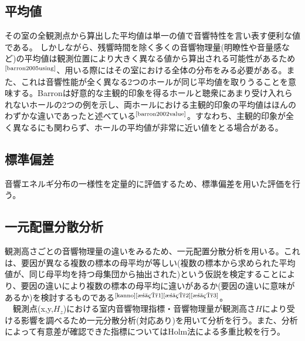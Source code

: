 \subsection{平均値}
その室の全観測点から算出した平均値は単一の値で音響特性を言い表す便利な値である。
しかしながら、残響時間を除く多くの音響物理量(明瞭性や音量感など)の平均値は観測位置により大きく異なる値から算出される可能性があるため$^{\text{\cite{barron2005using}}}$、用いる際にはその室における全体の分布をみる必要がある。また、これは音響性能が全く異なる2つのホールが同じ平均値を取りうることを意味する。Barronは好意的な主観的印象を得るホールと聴衆にあまり受け入れられないホールの2つの例を示し、両ホールにおける主観的印象の平均値はほんのわずかな違いであったと述べている$^{\text{\cite{barron2002value}}}$。すなわち、主観的印象が全く異なるにも関わらず、ホールの平均値が非常に近い値をとる場合がある。
\subsection{標準偏差}

音響エネルギ分布の一様性を定量的に評価するため、標準偏差を用いた評価を行う。

\subsection{一元配置分散分析}
観測高さごとの音響物理量の違いをみるため、一元配置分散分析を用いる。これは、要因が異なる複数の標本の母平均が等しい(複数の標本から求められた平均値が、同じ母平均を持つ母集団から抽出された)という仮説を検定することにより、要因の違いにより複数の標本の母平均に違いがあるか(要因の違いに意味があるか)を検討するものである$^{\text{\cite{kanno}{\cite{池田1}{\cite{池田2}{\cite{池田3}}}}}}$。
\\　観測点(x,y,$H_z$)における室内音響物理指標・音響物理量が観測高さ$H$により受ける影響を調べるため一元分散分析(対応あり)を用いて分析を行う。また、分析によって有意差が確認できた指標についてはHolm法による多重比較を行う。

